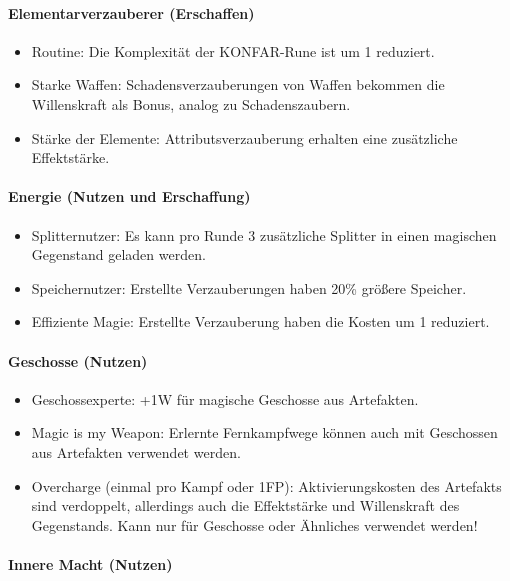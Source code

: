 \documentclass{article}
\begin{document}
\paragraph{Elementarverzauberer (Erschaffen)}

\begin{itemize}
\item Routine: Die Komplexität der KONFAR-Rune ist um 1 reduziert.
\item Starke Waffen: Schadensverzauberungen von Waffen bekommen die Willenskraft als Bonus, analog zu Schadenszaubern.
\item Stärke der Elemente: Attributsverzauberung erhalten eine zusätzliche Effektstärke.
\end{itemize}

\paragraph{Energie (Nutzen und Erschaffung)}

\begin{itemize}
\item Splitternutzer: Es kann pro Runde 3 zusätzliche Splitter in einen magischen Gegenstand geladen werden.
\item Speichernutzer: Erstellte Verzauberungen haben 20\% größere Speicher.
\item Effiziente Magie: Erstellte Verzauberung haben die Kosten um 1 reduziert.
\end{itemize}

\paragraph{Geschosse (Nutzen)}

\begin{itemize}
\item Geschossexperte: +1W für magische Geschosse aus Artefakten.
\item Magic is my Weapon: Erlernte Fernkampfwege können auch mit Geschossen aus Artefakten verwendet werden.
\item Overcharge (einmal pro Kampf oder 1FP): Aktivierungskosten des Artefakts sind verdoppelt, allerdings auch die Effektstärke und Willenskraft des Gegenstands. Kann nur für Geschosse oder Ähnliches verwendet werden!
\end{itemize}

\paragraph{Innere Macht (Nutzen)}
\end{document}
